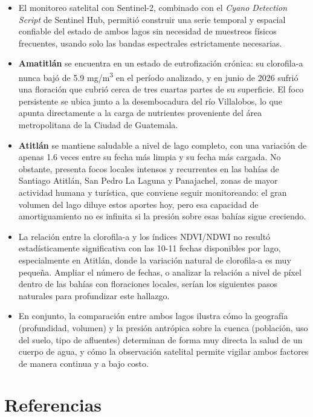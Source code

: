 \documentclass[11pt]{article}
\begin{document}
\begin{itemize}
    \item El monitoreo satelital con Sentinel-2, combinado con el \emph{Cyano Detection Script} de Sentinel Hub, permiti\'o construir una serie temporal y espacial confiable del estado de ambos lagos sin necesidad de muestreos f\'isicos frecuentes, usando solo las bandas espectrales estrictamente necesarias.
    \item \textbf{Amatitl\'an} se encuentra en un estado de eutrofizaci\'on cr\'onica: su clorofila-a nunca baj\'o de 5.9 mg/m\textsuperscript{3} en el per\'iodo analizado, y en junio de 2026 sufri\'o una floraci\'on que cubri\'o cerca de tres cuartas partes de su superficie. El foco persistente se ubica junto a la desembocadura del r\'io Villalobos, lo que apunta directamente a la carga de nutrientes proveniente del \'area metropolitana de la Ciudad de Guatemala.
    \item \textbf{Atitl\'an} se mantiene saludable a nivel de lago completo, con una variaci\'on de apenas 1.6 veces entre su fecha m\'as limpia y su fecha m\'as cargada. No obstante, presenta focos locales intensos y recurrentes en las bah\'ias de Santiago Atitl\'an, San Pedro La Laguna y Panajachel, zonas de mayor actividad humana y tur\'istica, que conviene seguir monitoreando: el gran volumen del lago diluye estos aportes hoy, pero esa capacidad de amortiguamiento no es infinita si la presi\'on sobre esas bah\'ias sigue creciendo.
    \item La relaci\'on entre la clorofila-a y los \'indices NDVI/NDWI no result\'o estad\'isticamente significativa con las 10-11 fechas disponibles por lago, especialmente en Atitl\'an, donde la variaci\'on natural de clorofila-a es muy peque\~na. Ampliar el n\'umero de fechas, o analizar la relaci\'on a nivel de p\'ixel dentro de las bah\'ias con floraciones locales, ser\'ian los siguientes pasos naturales para profundizar este hallazgo.
    \item En conjunto, la comparaci\'on entre ambos lagos ilustra c\'omo la geograf\'ia (profundidad, volumen) y la presi\'on antr\'opica sobre la cuenca (poblaci\'on, uso del suelo, tipo de afluentes) determinan de forma muy directa la salud de un cuerpo de agua, y c\'omo la observaci\'on satelital permite vigilar ambos factores de manera continua y a bajo costo.
\end{itemize}

\section*{Referencias}
\end{document}
